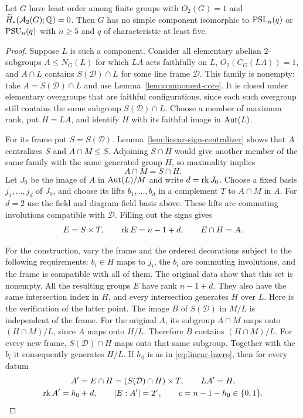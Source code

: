 \begin{proposition}\label{prop:linear-two}
Let $G$ have least order among finite groups with $O_2(G)=1$ and
$\widetilde H_*(\mathcal A_2(G);\mathbb Q)=0$.
Then $G$ has no simple component isomorphic to $\operatorname{PSL}_n(q)$ or
$\operatorname{PSU}_n(q)$ with $n\ge5$ and $q$ of characteristic at least five.
\end{proposition}

\begin{proof}
Suppose $L$ is such a component.  Consider all elementary abelian
$2$-subgroups $A\le N_G(L)$ for which $LA$ acts faithfully on $L$,
$O_2(C_G(LA))=1$, and $A\cap L$ contains $S(\mathcal D)\cap L$
for some line frame $\mathcal D$.  This family is nonempty: take
$A=S(\mathcal D)\cap L$ and use Lemma~\ref{lem:component-core}.
It is closed under elementary overgroups that are faithful
configurations, since each such overgroup still contains the same
subgroup $S(\mathcal D)\cap L$.
Choose a member of maximum rank, put $H=LA$, and identify $H$ with its
faithful image in $\operatorname{Aut}(L)$.

For its frame put $S=S(\mathcal D)$.  Lemma~\ref{lem:linear-sign-centralizer}
shows that $A$ centralizes $S$ and $A\cap M\le S$.  Adjoining $S\cap H$
would give another member of the same family with the same generated
group $H$, so maximality implies
\[
 A\cap M=S\cap H.
\]
Let $J_0$ be the image of $A$ in $\operatorname{Aut}(L)/M$ and write $d=\operatorname{rk} J_0$.
Choose a fixed basis $j_1,\ldots,j_d$ of $J_0$, and choose its lifts
$b_1,\ldots,b_d$ in a complement $T$ to $A\cap M$ in $A$.
For $d=2$ use the field and diagram-field basis above.  These lifts are
commuting involutions compatible with $\mathcal D$.  Filling out the
signs gives
\begin{equation}\label{eq:linear-E-intersection}
 E=S\times T,
 \qquad \operatorname{rk} E=n-1+d,
 \qquad E\cap H=A.
\end{equation}

For the construction, vary the frame and the ordered decorations subject
to the following requirements: $b_i\in H$ maps to $j_i$, the $b_i$ are
commuting involutions, and the frame is compatible with all of them.
The original data show that this set is nonempty.  All the resulting
groups $E$ have rank $n-1+d$.  They also have the same intersection index
in $H$, and every intersection generates $H$ over $L$.
Here is the verification of the latter point.  The image
$B$ of $S(\mathcal D)$ in $M/L$ is independent of the frame.
For the original $A$, its subgroup $A\cap M$ maps onto
$(H\cap M)/L$, since $A$ maps onto $H/L$.  Therefore $B$ contains
$(H\cap M)/L$.  For every new frame, $S(\mathcal D)\cap H$ maps onto
that same subgroup.  Together with the $b_i$ it consequently generates
$H/L$.  If $h_0$ is as in \eqref{eq:linear-hzero}, then for every datum
\begin{equation}\label{eq:linear-constant-index}
\begin{gathered}
 A'=E\cap H=(S(\mathcal D)\cap H)\times T,
 \qquad LA'=H,\\
 \operatorname{rk} A'=h_0+d,\qquad |E:A'|=2^c,\qquad
 c=n-1-h_0\in\{0,1\}.
\end{gathered}
\end{equation}


\end{proof}
